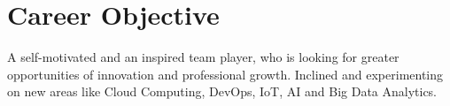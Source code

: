 \documentclass[espanol]{cv-style}     %
\begin{document}
\vspace{0.2cm}
\section{Career Objective}
  \vspace{-0.2cm}
A self-motivated and an inspired team player, who is looking for greater opportunities of innovation and professional growth.
Inclined and experimenting on new areas like Cloud Computing, DevOps, IoT, AI and Big Data Analytics.
\end{document}

